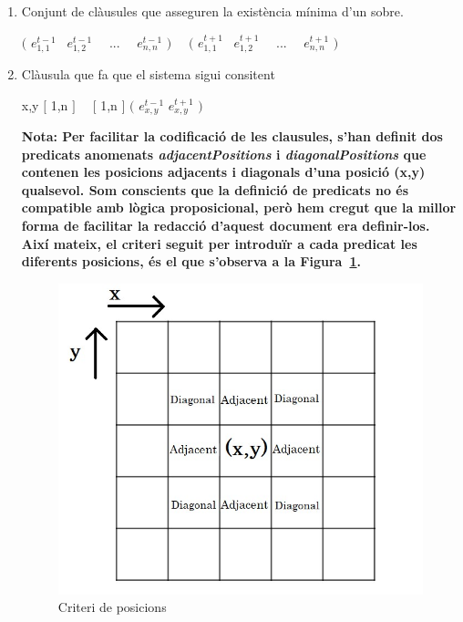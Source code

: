 \documentclass[a4paper,12pt]{article}
\begin{document}
\begin{enumerate}
    \item Conjunt de clàusules que asseguren la existència mínima d'un sobre.
    \begin{center}
        
        $($ $e_{1,1} ^ {t-1}$ \vee \ $e_{1,2} ^ {t-1}$ \ \vee \ ... \ \vee \ $e_{n,n} ^ {t-1}$ $)$ \ \wedge \ $($  $e_{1,1} ^ {t+1}$ \vee \ $e_{1,2} ^ {t+1}$ \ \vee \ ... \ \vee \ $e_{n,n} ^ {t+1}$ $)$
        
    \end{center}
    \item Clàusula que fa que el sistema sigui consitent
    \begin{center}
        
        \forall x,y \in $[$ 1,n $]$ \ \times \ $[$ 1,n $]$ $($ \neg $e_{x,y} ^ {t-1}$ \rightarrow \neg  $e_{x,y} ^ {t+1}$ $)$
        
    \end{center}
    
    \textbf{Nota: Per facilitar la codificació de les clausules, s'han definit dos predicats anomenats \textit{adjacentPositions} i \textit{diagonalPositions} que contenen les posicions adjacents i diagonals d'una posició (x,y) qualsevol. Som conscients que la definició de predicats no és compatible amb lògica proposicional, però hem cregut que la millor forma de facilitar la redacció d'aquest document era definir-los. Així mateix, el criteri seguit per introduïr a cada predicat les diferents posicions, és el que s'observa a la Figura~\ref{fig:posicions}.}
    
    \begin{figure}[H]
    \centering
	\includegraphics[scale = 0.7]{images/Position sets.jpg}
	\caption{Criteri de posicions}
	\label{fig:posicions}
\end{figure}


\end{enumerate}
\end{document}
